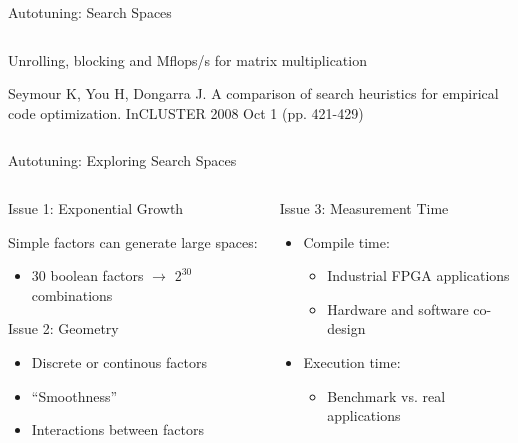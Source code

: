 \documentclass[10pt, compress, aspectratio=169, xcolor={table,usenames,dvipsnames}]{beamer}
\begin{document}
\begin{frame}[label={sec:orgc323e6b}]{Autotuning: Search Spaces}
\begin{columns}
\begin{column}{0.6\columnwidth}
\begin{center}
\alert{Unrolling}, \alert{blocking} and \alert{Mflops/s} for \alert{matrix multiplication}

\vspace{.1cm}

\scriptsize{Seymour K, You H, Dongarra J. A comparison of search heuristics for empirical code optimization. InCLUSTER 2008 Oct 1 (pp. 421-429)}
\end{center}
\end{column}
\end{columns}
\end{frame}

\begin{frame}[label={sec:org311e0ec}]{Autotuning: Exploring Search Spaces}
\begin{columns}
\begin{column}{0.5\columnwidth}
\begin{block}{Issue 1: \alert{Exponential Growth}}
\vspace{.2cm}

\alert{Simple factors} can generate \alert{large spaces}:

\begin{itemize}
\item 30 \alert{boolean} factors \(\rightarrow\) \(2^{30}\) combinations
\end{itemize}

\begin{block}{Issue 2: \alert{Geometry}}
\begin{itemize}
\item \alert{Discrete} or \alert{continous} factors
\item \alert{``Smoothness''}
\item \alert{Interactions} between factors
\end{itemize}
\end{block}
\end{block}
\end{column}

\begin{column}{0.5\columnwidth}
\begin{block}{Issue 3: \alert{Measurement Time}}
\vspace{.2cm}

\begin{itemize}
\item \alert{Compile} time:
\begin{itemize}
\item Industrial \alert{FPGA} applications
\item Hardware and software \alert{co-design}
\end{itemize}
\item \alert{Execution} time:
\begin{itemize}
\item \alert{Benchmark} vs. \alert{real applications}
\end{itemize}
\end{itemize}
\end{block}
\end{column}
\end{columns}
\end{frame}
\end{document}
